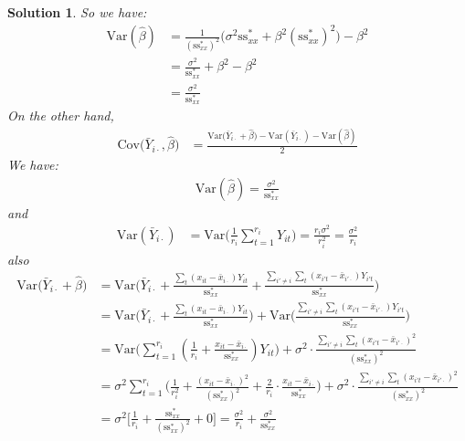 \documentclass[11pt]{article}
\newtheorem{sol}{Solution}
\begin{document}
\begin{sol}
So we have:
\begin{align*}
	\text{Var}(\hat{\beta}) &= \frac{1}{(\text{ss}^{\ast}_{xx})^2}\Big(\sigma^2\text{ss}^{\ast}_{xx} + \beta^2(\text{ss}^{\ast}_{xx})^2\Big) - \beta^2\\
	&= \frac{\sigma^2}{\text{ss}^{\ast}_{xx}} + \beta^2 - \beta^2\\
	&= \frac{\sigma^2}{\text{ss}^{\ast}_{xx}}
\end{align*}
\vskip 2mm
On the other hand,
\begin{align*}
	\text{Cov}\Big(\bar{Y}_{i\cdot}, \hat{\beta}\Big) &= \frac{\text{Var}\Big(\bar{Y}_{i\cdot}  + \hat{\beta}\Big)- \text{Var}(\bar{Y}_{i\cdot}) - \text{Var}(\hat{\beta})}{2}
\end{align*}
We have:
\begin{align*}
	\text{Var}(\hat{\beta}) = \frac{\sigma^2}{\text{ss}^{\ast}_{xx}}
\end{align*}
and
\begin{align*}
	\text{Var}(\bar{Y}_{i\cdot}) &= \text{Var}\Big(\frac{1}{r_i}\sum_{t = 1}^{r_i}Y_{it}\Big) = \frac{r_i\sigma^2}{r_i^2} = \frac{\sigma^2}{r_i}
\end{align*}
also
\begin{align*}
	\text{Var}\Big(\bar{Y}_{i\cdot} + \hat{\beta}\Big) &= \text{Var}\Big(\bar{Y}_{i\cdot} + \frac{\sum_t(x_{it} - \bar{x}_{i\cdot})Y_{it}}{\text{ss}^{\ast}_{xx}} + \frac{\sum_{i'\neq i}\sum_t(x_{i't} - \bar{x}_{i'\cdot})Y_{i't}}{\text{ss}^{\ast}_{xx}}\Big)\\
	&= \text{Var}\Big(\bar{Y}_{i\cdot} +  \frac{\sum_t(x_{it} - \bar{x}_{i\cdot})Y_{it}}{\text{ss}^{\ast}_{xx}}\Big) + \text{Var}\Big(\frac{\sum_{i'\neq i}\sum_t(x_{i't} - \bar{x}_{i'\cdot})Y_{i't}}{\text{ss}^{\ast}_{xx}}\Big)\\
	&= \text{Var}\Big(\sum_{t = 1}^{r_i}(\frac{1}{r_i} + \frac{x_{it} - \bar{x}_{i\cdot}}{\text{ss}^{\ast}_{xx}})Y_{it}\Big) + \sigma^2\cdot \frac{\sum_{i'\neq i}\sum_t(x_{i't} - \bar{x}_{i'\cdot})^2}{(\text{ss}^{\ast}_{xx})^2}\\
	&= \sigma^2\sum_{t = 1}^{r_i}\Big(\frac{1}{r_i^2} + \frac{(x_{it} - \bar{x}_{i\cdot})^2}{(\text{ss}^{\ast}_{xx})^2} + \frac{2}{r_i}\cdot\frac{x_{it} - \bar{x}_{i\cdot}}{\text{ss}^{\ast}_{xx}}\Big) + \sigma^2\cdot \frac{\sum_{i'\neq i}\sum_t(x_{i't} - \bar{x}_{i'\cdot})^2}{(\text{ss}^{\ast}_{xx})^2}\\
	&= \sigma^2\Big[\frac{1}{r_i} + \frac{\text{ss}^{\ast}_{xx}}{(\text{ss}^{\ast}_{xx})^2} + 0\Big] = \frac{\sigma^2}{r_i} + \frac{\sigma^2}{\text{ss}^{\ast}_{xx}}
\end{align*}

\end{sol}
\end{document}

